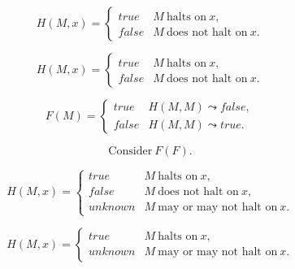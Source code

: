 \begin{frame}[plain]

$$H(M,x)=\left\{
\begin{array}{ll}
true&M\ \text{halts on}\ x,\\
false&M\ \text{does not halt on}\ x.
\end{array}
\right.$$

\end{frame}

\begin{frame}

$$H(M,x)=\left\{
\begin{array}{ll}
true&M\ \text{halts on}\ x,\\
false&M\ \text{does not halt on}\ x.
\end{array}
\right.$$

$$F(M)=\left\{
\begin{array}{ll}
true& H(M,M) \leadsto false,\\
false& H(M,M) \leadsto true.
\end{array}
\right.$$

$$\text{Consider}\ F(F).$$

\end{frame}

\begin{frame}

$$H(M,x)=\left\{
\begin{array}{ll}
true&M\ \text{halts on}\ x,\\
false&M\ \text{does not halt on}\ x,\\
unknown&M\ \text{may or may not halt on}\ x.
\end{array}
\right.$$


\end{frame}

\begin{frame}

$$H(M,x)=\left\{
\begin{array}{ll}
true&M\ \text{halts on}\ x,\\
unknown&M\ \text{may or may not halt on}\ x.
\end{array}
\right.$$


\end{frame}
